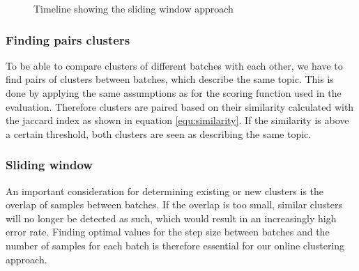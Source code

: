 \begin{figure}[h]
    \centering


    \caption{Timeline showing the sliding window approach}
    \label{fig:timeline}
\end{figure}

\subsubsection{Finding pairs clusters}

To be able to compare clusters of different batches with each other, we have to find pairs of clusters between batches, which describe the same topic. This is done by applying the same assumptions as for the scoring function used in the evaluation. Therefore clusters are paired based on their similarity calculated with the jaccard index as shown in equation \ref{equ:similarity}. If the similarity is above a certain threshold, both clusters are seen as describing the same topic.

\subsubsection{Sliding window}

An important consideration for determining existing or new clusters is the overlap of samples between batches. If the overlap is too small, similar clusters will no longer be detected as such, which would result in an increasingly high error rate. Finding optimal values for the step size between batches and the number of samples for each batch is therefore essential for our online clustering approach.
